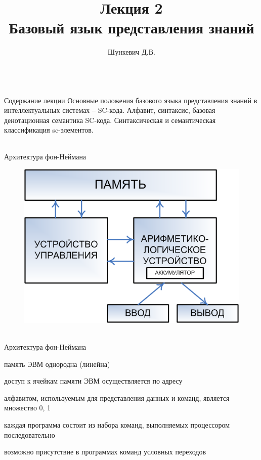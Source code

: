 \title{Лекция 2\\Базовый язык представления знаний}   
\author[]{Шункевич Д.В.}

\begin{frame}
	\titlepage
\end{frame}

\begin{frame}{\\Содержание лекции}
	\topline
	\justifying
	Основные положения базового языка представления знаний в интеллектуальных системах -- SC-кода.
	Алфавит, синтаксис, базовая денотационная семантика SC-кода.
	Синтаксическая и семантическая классификация sc-элементов.
\end{frame}

\begin{frame}{\\Архитектура фон-Неймана}
	\topline
	\justifying
	\vspace{10mm}
	\begin{figure}[H]
		\includegraphics[scale=0.6]{./figures/sd_sc_code/neuman.png}
	\end{figure}
\end{frame}

\begin{frame}{\\Архитектура фон-Неймана}
	\topline
	\justifying
	\large
	\begin{textitemize}
		\item память ЭВМ однородна (линейна)
		\item доступ к ячейкам памяти ЭВМ осуществляется по адресу
		\item алфавитом, используемым для представления данных и команд, является множество {0, 1}
		\item каждая программа состоит из набора команд, выполняемых процессором последовательно
		\item возможно присутствие в программах команд условных переходов
	\end{textitemize}
\end{frame}

